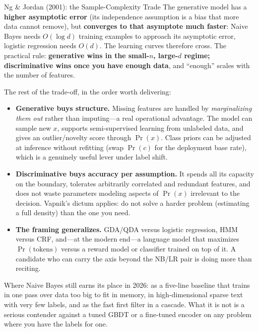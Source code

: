 \begin{mathresult}{Ng \& Jordan (2001): the Sample-Complexity Trade}
The generative model has a \textbf{higher asymptotic error} (its independence assumption is a bias that more data cannot remove), but \textbf{converges to that asymptote much faster}: Naive Bayes needs $O(\log d)$ training examples to approach its asymptotic error, logistic regression needs $O(d)$. The learning curves therefore cross. The practical rule: \textbf{generative wins in the small-$n$, large-$d$ regime; discriminative wins once you have enough data}, and ``enough'' scales with the number of features.
\end{mathresult}

The rest of the trade-off, in the order worth delivering:
\begin{itemize}
    \item \textbf{Generative buys structure.} Missing features are handled by \emph{marginalizing them out} rather than imputing---a real operational advantage. The model can sample new $x$, supports semi-supervised learning from unlabeled data, and gives an outlier/novelty score through $\Pr(x)$. Class priors can be adjusted at inference without refitting (swap $\Pr(c)$ for the deployment base rate), which is a genuinely useful lever under label shift.
    \item \textbf{Discriminative buys accuracy per assumption.} It spends all its capacity on the boundary, tolerates arbitrarily correlated and redundant features, and does not waste parameters modeling aspects of $\Pr(x)$ irrelevant to the decision. Vapnik's dictum applies: do not solve a harder problem (estimating a full density) than the one you need.
    \item \textbf{The framing generalizes.} GDA/QDA versus logistic regression, HMM versus CRF, and---at the modern end---a language model that maximizes $\Pr(\text{tokens})$ versus a reward model or classifier trained on top of it. A candidate who can carry the axis beyond the NB/LR pair is doing more than reciting.
\end{itemize}

Where Naive Bayes still earns its place in 2026: as a five-line baseline that trains in one pass over data too big to fit in memory, in high-dimensional sparse text with very few labels, and as the fast first filter in a cascade. What it is not is a serious contender against a tuned GBDT or a fine-tuned encoder on any problem where you have the labels for one.

